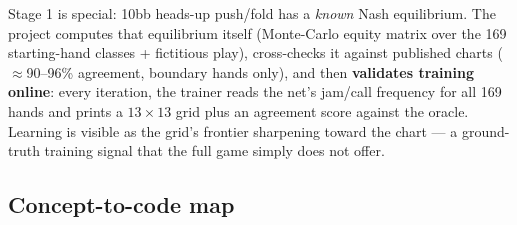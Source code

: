 \documentclass[11pt,a4paper]{article}
\begin{document}
\begin{center}
\end{center}

Stage 1 is special: 10bb heads-up push/fold has a \emph{known} Nash
equilibrium. The project computes that equilibrium itself (Monte-Carlo equity
matrix over the 169 starting-hand classes + fictitious play), cross-checks it
against published charts ($\approx$90--96\% agreement, boundary hands only),
and then \textbf{validates training online}: every iteration, the trainer reads
the net's jam/call frequency for all 169 hands and prints a $13\times13$ grid
plus an agreement score against the oracle. Learning is visible as the grid's
frontier sharpening toward the chart --- a ground-truth training signal that
the full game simply does not offer.

\subsection{Concept-to-code map}
\end{document}
